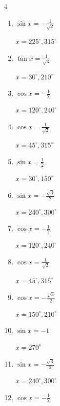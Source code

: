 \begin{multicols}{4}
\begin{enumerate}
  \item $\displaystyle \sin{x}  = -\frac{1}{\sqrt{2}}$

        $\displaystyle x = 225^{\circ} , 315^{\circ}$

  \item $\displaystyle \tan{x}  = \frac{1}{\sqrt{3}}$

        $\displaystyle x = 30^{\circ} , 210^{\circ}$

  \item $\displaystyle \cos{x}  = -\frac{1}{2}$

        $\displaystyle x = 120^{\circ} , 240^{\circ}$

  \item $\displaystyle \cos{x}  = \frac{1}{\sqrt{2}}$

        $\displaystyle x = 45^{\circ} , 315^{\circ}$

  \item $\displaystyle \sin{x}  = \frac{1}{2}$

        $\displaystyle x = 30^{\circ} , 150^{\circ}$

  \item $\displaystyle \sin{x}  = -\frac{\sqrt{3}}{2}$

        $\displaystyle x = 240^{\circ} , 300^{\circ}$

  \item $\displaystyle \cos{x}  = -\frac{1}{2}$

        $\displaystyle x = 120^{\circ} , 240^{\circ}$

  \item $\displaystyle \cos{x}  = \frac{1}{\sqrt{2}}$

        $\displaystyle x = 45^{\circ} , 315^{\circ}$

  \item $\displaystyle \cos{x}  = -\frac{\sqrt{3}}{2}$

        $\displaystyle x = 150^{\circ} , 210^{\circ}$

  \item $\displaystyle \sin{x}  = -1$

        $\displaystyle x = 270^{\circ}$

  \item $\displaystyle \sin{x}  = -\frac{\sqrt{3}}{2}$

        $\displaystyle x = 240^{\circ} , 300^{\circ}$

\columnbreak %

  \item $\displaystyle \cos{x}  = -\frac{1}{2}$


\end{enumerate}
\end{multicols}
